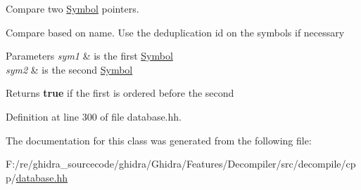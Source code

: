 Compare two \mbox{\hyperlink{class_symbol}{Symbol}} pointers. 

Compare based on name. Use the deduplication id on the symbols if necessary 
\begin{DoxyParams}{Parameters}
{\em sym1} & is the first \mbox{\hyperlink{class_symbol}{Symbol}} \\
\hline
{\em sym2} & is the second \mbox{\hyperlink{class_symbol}{Symbol}} \\
\hline
\end{DoxyParams}
\begin{DoxyReturn}{Returns}
{\bfseries{true}} if the first is ordered before the second 
\end{DoxyReturn}


Definition at line 300 of file database.\+hh.



The documentation for this class was generated from the following file\+:\begin{DoxyCompactItemize}
\item 
F\+:/re/ghidra\+\_\+sourcecode/ghidra/\+Ghidra/\+Features/\+Decompiler/src/decompile/cpp/\mbox{\hyperlink{database_8hh}{database.\+hh}}\end{DoxyCompactItemize}
